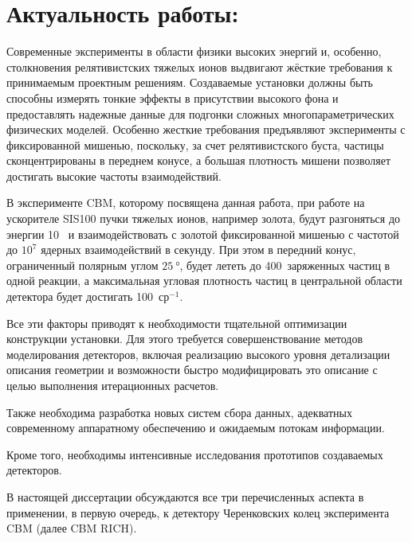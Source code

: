 \section*{Актуальность работы:}

Современные эксперименты в области физики высоких энергий и, особенно, столкновения релятивистских тяжелых ионов выдвигают жёсткие требования к принимаемым проектным решениям. Создаваемые установки должны быть способны измерять тонкие эффекты в присутствии высокого фона и предоставлять надежные данные для подгонки сложных многопараметрических физических моделей. Особенно жесткие требования предъявляют эксперименты с фиксированной мишенью, поскольку, за счет релятивистского буста, частицы сконцентрированы в переднем конусе, а большая плотность мишени позволяет достигать высокие частоты взаимодействий.

В эксперименте CBM, которому посвящена данная работа, при работе на ускорителе SIS100 пучки тяжелых ионов, например золота, будут разгоняться до энергии 10~\GeVperNucl{} и взаимодействовать с золотой фиксированной мишенью с частотой до $10^7$ ядерных взаимодействий в секунду. При этом в передний конус, ограниченный полярным углом $\SI{25}{\degree}$, будет лететь до 400~заряженных частиц в одной реакции, а максимальная угловая плотность частиц в центральной области детектора будет достигать 100~ср$^{-1}$.

Все эти факторы приводят к необходимости тщательной оптимизации конструкции установки. Для этого требуется совершенствование методов моделирования детекторов, включая реализацию высокого уровня детализации описания геометрии и возможности быстро модифицировать это описание с целью выполнения итерационных расчетов.

Также необходима разработка новых систем сбора данных, адекватных современному аппаратному обеспечению и ожидаемым потокам информации.

Кроме того, необходимы интенсивные исследования прототипов создаваемых детекторов.

В настоящей диссертации обсуждаются все три перечисленных аспекта в применении, в первую очередь, к детектору Черенковских колец эксперимента CBM (далее CBM RICH).
